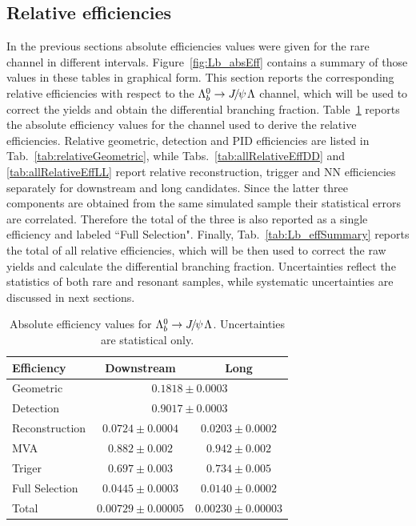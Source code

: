 \subsection{Relative efficiencies}

In the previous sections absolute efficiencies values were given for the rare channel in different \qsq intervals.
Figure~\ref{fig:Lb_absEff} contains a summary of those values in these tables in graphical form.
This section reports the corresponding relative efficiencies with respect to the $\Lb\to\jpsi\Lz$ channel, which will be
used to correct the yields and obtain the differential branching fraction. Table~\ref{tab:jpsiEff} reports the absolute 
efficiency values for the \jpsi channel used to derive the relative efficiencies.
Relative geometric, detection and PID efficiencies are listed in Tab.~\ref{tab:relativeGeometric}, while
Tabs.~\ref{tab:allRelativeEffDD} and \ref{tab:allRelativeEffLL} report relative reconstruction, trigger and NN efficiencies 
separately for downstream and long candidates. Since the latter three components are obtained from the 
same simulated sample their statistical errors are correlated. Therefore the total of the three is also reported 
as a single efficiency and labeled ``Full Selection". Finally, Tab.~\ref{tab:Lb_effSummary} reports the total of 
all relative efficiencies, which will be then used to correct the raw yields and calculate the differential branching fraction.
Uncertainties reflect the statistics of both rare and resonant samples, while systematic uncertainties are discussed in next sections.

\begin{table}
\centering
\caption{Absolute efficiency values for $\Lb\to\jpsi\Lz$. Uncertainties are statistical only.}
\begin{tabular}{lcc} \hline
Efficiency		& 	Downstream				& 	Long				\\  \hline		
Geometric 		&   	\multicolumn{2}{c}{	$0.1818 \pm 0.0003$ } 	\\	
Detection 		&   	\multicolumn{2}{c}{	$0.9017 \pm 0.0003$ } 	\\
Reconstruction 	& 	$0.0724 \pm 0.0004$   & $0.0203 \pm 0.0002$     \\
MVA 			&	$0.882 \pm 0.002$   & $0.942 \pm 0.002$     \\
Triger 			&	$0.697 \pm 0.003$   & $0.734 \pm 0.005$     \\ \hline
Full Selection	&	$0.0445 \pm 0.0003$   & $0.0140 \pm 0.0002$     \\ \hline
Total  			&	$0.00729 \pm 0.00005$   & $0.00230 \pm 0.00003$    	\\
\end{tabular}
\label{tab:jpsiEff}
\end{table}


